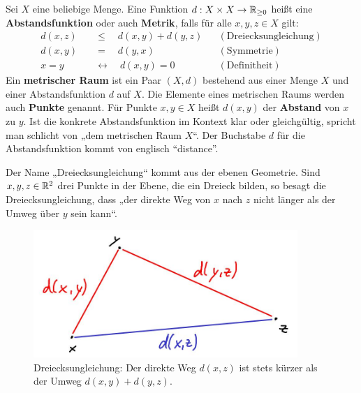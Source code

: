 \begin{defin}[* Abstandsfunktion] \label{def:abstand}    
    Sei $X$ eine beliebige Menge. Eine Funktion $d:X\times X\to \mathbb R_{\ge 0}$ heißt eine \textbf{Abstandsfunktion} oder auch \textbf{Metrik}, falls für alle $x,y,z\in X$ gilt:
    \begin{align*}
        d(x,z) \quad&\le\quad d(x,y)+d(y,z) && (\text{Dreiecksungleichung}) \\
        d(x,y) \quad&=\quad d(y,x) && (\text{Symmetrie}) \\
        x=y \quad&\leftrightarrow\quad d(x,y)=0 && (\text{Definitheit})
    \end{align*}
    Ein \textbf{metrischer Raum} ist ein Paar $(X,d)$ bestehend aus einer Menge $X$ und einer Abstandsfunktion $d$ auf $X$. Die Elemente eines metrischen Raums werden auch \textbf{Punkte} genannt. Für Punkte $x,y\in X$ heißt $d(x,y)$ der \textbf{Abstand} von $x$ zu $y$. Ist die konkrete Abstandsfunktion im Kontext klar oder gleichgültig, spricht man schlicht von „dem metrischen Raum $X$“. Der Buchstabe $d$ für die Abstandsfunktion kommt von englisch ``distance''. 
\end{defin}


\begin{bem}
    Der Name „Dreiecksungleichung“ kommt aus der ebenen Geometrie. Sind $x,y,z\in \mathbb R^2$ drei Punkte in der Ebene, die ein Dreieck bilden, so besagt die Dreiecksungleichung, dass „der direkte Weg von $x$ nach $z$ nicht länger als der Umweg über $y$ sein kann“.
    \begin{figure}[ht]
        \includegraphics[width=10cm]{./_img/Dreiecksungleichung.jpeg}
        \centering \caption{Dreiecksungleichung: Der direkte Weg $d(x,z)$ ist stets kürzer als der Umweg $d(x,y)+d(y,z)$.}
    \end{figure}
\end{bem}


